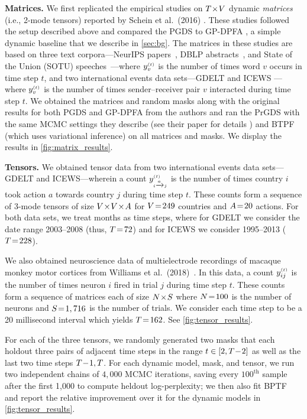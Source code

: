 \documentclass{article}
\begin{document}
\textbf{Matrices.} We first replicated the empirical studies on $T\!\times\! V$ dynamic \emph{matrices} (i.e., 2-mode tensors) reported by Schein et al.~(2016) \cite{schein2016poisson}. These studies followed the setup described above and compared the PGDS to GP-DPFA \cite{acharya2015nonparametric}, a simple dynamic baseline that we describe in \cref{sec:bg}. The matrices in these studies are based on three text corpora---NeurIPS papers~\cite{neuripscorpus}, DBLP abstracts~\cite{dblp}, and State of the Union (SOTU) speeches~\cite{sotu}---where $\yvt$ is the number of times word $v$ occurs in time step $t$, and two international events data sets---GDELT \cite{leetaru2013gdelt} and ICEWS \cite{boscheeicews}---where $\yvt$ is the number of times sender--receiver pair $v$ interacted during time step $t$. We obtained the matrices and random masks along with the original results for both PGDS and GP-DPFA from the authors and ran the PrGDS with the same MCMC settings they describe (see their paper for details \cite{schein2016poisson}) and BTPF (which uses variational inference) on all matrices and masks. We display the results in \cref{fig:matrix_results}.~

\textbf{Tensors.} We obtained tensor data from two international events data sets---GDELT and ICEWS---wherein a count $y_{\mathsmaller{i \xrightarrow{a}j}}^{\mathsmaller{(t)}}$ is the number of times country $i$ took action $a$ towards country $j$ during time step $t$. These counts form a sequence of 3-mode tensors of size $V \!\times\! V \!\times\! A$ for $V \!=\! 249$ countries and $A \!=\! 20$ actions. For both data sets, we treat months as time steps, where for GDELT we consider the date range 2003--2008 (thus, $T \!=\! 72$) and for ICEWS we consider 1995--2013 ($T \!=\! 228$). 

We also obtained neuroscience data of multielectrode recordings of macaque monkey motor cortices from Williams et al.~(2018)~\cite{williams2018unsupervised}. In this data, a count $y^{\mathsmaller{(t)}}_{ij}$ is the number of times neuron $i$ fired in trial $j$ during time step $t$. These counts form a sequence of matrices each of size $N \!\times\! S$ where $N \!=\! 100$ is the number of neurons and $S \!=\! 1,716$ is the number of trials. We consider each time step to be a 20 millisecond interval which yields $T \!=\! 162$. See \cref{fig:tensor_results}. 

For each of the three tensors, we randomly generated two masks that each holdout three pairs of adjacent time steps in the range $t \in [2, T\!-\! 2]$ as well as the last two time steps $T\!-\! 1, T$. For each dynamic model, mask, and tensor, we run two independent chains of $4,000$ MCMC iterations, saving every $100^{\textrm{th}}$ sample after the first 1,000 to compute heldout log-perplexity; we then also fit BPTF and report the relative improvement over it for the dynamic models in \cref{fig:tensor_results}.
\end{document}
